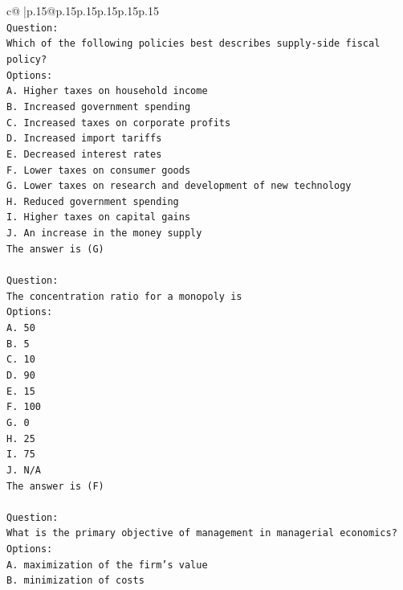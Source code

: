 \documentclass{article}
\begin{document}
{\begin{supertabular}{c@{$\;$}|p{.15\linewidth}@{}p{.15\linewidth}p{.15\linewidth}p{.15\linewidth}p{.15\linewidth}p{.15\linewidth}}
{{{\\ 
\texttt{Question:} \\
\texttt{Which of the following policies best describes supply{-}side fiscal policy?} \\
\texttt{Options:} \\
\texttt{A. Higher taxes on household income} \\
\texttt{B. Increased government spending} \\
\texttt{C. Increased taxes on corporate profits} \\
\texttt{D. Increased import tariffs} \\
\texttt{E. Decreased interest rates} \\
\texttt{F. Lower taxes on consumer goods} \\
\texttt{G. Lower taxes on research and development of new technology} \\
\texttt{H. Reduced government spending} \\
\texttt{I. Higher taxes on capital gains} \\
\texttt{J. An increase in the money supply} \\
\texttt{The answer is (G)} \\
\\ 
\texttt{Question:} \\
\texttt{The concentration ratio for a monopoly is} \\
\texttt{Options:} \\
\texttt{A. 50} \\
\texttt{B. 5} \\
\texttt{C. 10} \\
\texttt{D. 90} \\
\texttt{E. 15} \\
\texttt{F. 100} \\
\texttt{G. 0} \\
\texttt{H. 25} \\
\texttt{I. 75} \\
\texttt{J. N/A} \\
\texttt{The answer is (F)} \\
\\ 
\texttt{Question:} \\
\texttt{What is the primary objective of management in managerial economics?} \\
\texttt{Options:} \\
\texttt{A. maximization of the firm's value} \\
\texttt{B. minimization of costs} \\
}}}
\end{supertabular}}
\end{document}
